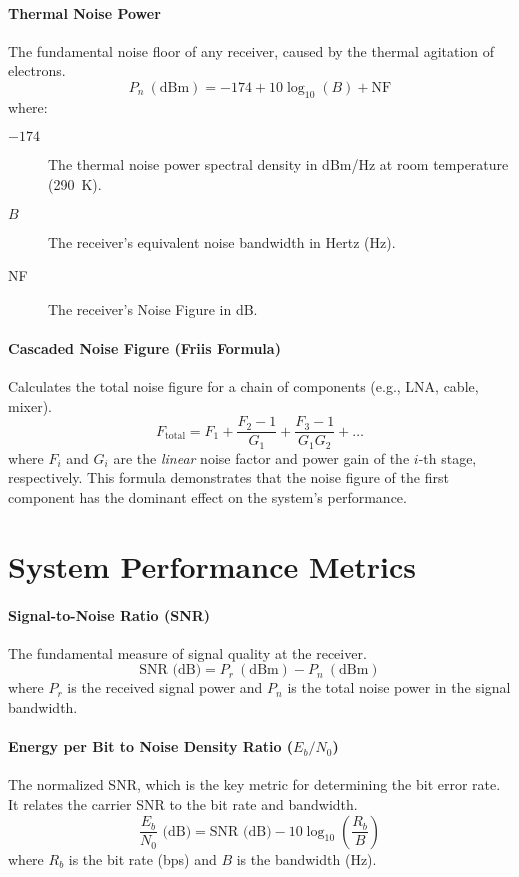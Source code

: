 \paragraph{Thermal Noise Power}
The fundamental noise floor of any receiver, caused by the thermal agitation of electrons.
\begin{equation}
    P_n\ (\text{dBm}) = -174 + 10\log_{10}(B) + \text{NF}
\end{equation}
where:
\begin{description}
    \item[\(-174\)] The thermal noise power spectral density in dBm/Hz at room temperature (290~K).
    \item[\(B\)] The receiver's equivalent noise bandwidth in Hertz (Hz).
    \item[NF] The receiver's Noise Figure in dB.
\end{description}

\paragraph{Cascaded Noise Figure (Friis Formula)}
Calculates the total noise figure for a chain of components (e.g., LNA, cable, mixer).
\begin{equation}
    F_{\text{total}} = F_1 + \frac{F_2 - 1}{G_1} + \frac{F_3 - 1}{G_1 G_2} + \dots
\end{equation}
where \(F_i\) and \(G_i\) are the \textit{linear} noise factor and power gain of the \(i\)-th stage, respectively. This formula demonstrates that the noise figure of the first component has the dominant effect on the system's performance.

\section{System Performance Metrics}

\paragraph{Signal-to-Noise Ratio (SNR)}
The fundamental measure of signal quality at the receiver.
\begin{equation}
    \text{SNR (dB)} = P_{r}\ (\text{dBm}) - P_{n}\ (\text{dBm})
\end{equation}
where \(P_r\) is the received signal power and \(P_n\) is the total noise power in the signal bandwidth.

\paragraph{Energy per Bit to Noise Density Ratio (\(E_b/N_0\))}
The normalized SNR, which is the key metric for determining the bit error rate. It relates the carrier SNR to the bit rate and bandwidth.
\begin{equation}
    \frac{E_b}{N_0} \text{ (dB)} = \text{SNR (dB)} - 10\log_{10}\left(\frac{R_b}{B}\right)
\end{equation}
where \(R_b\) is the bit rate (bps) and \(B\) is the bandwidth (Hz).


